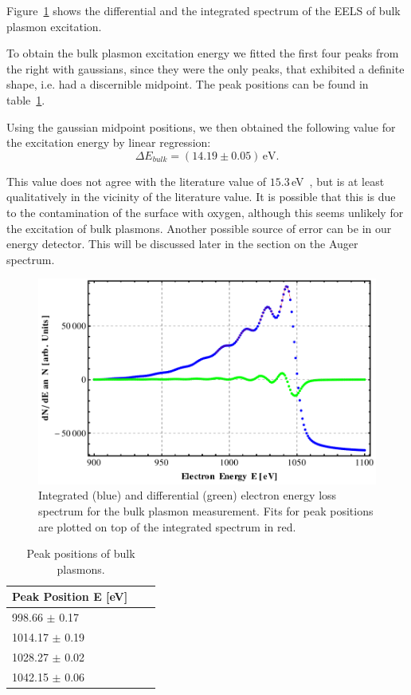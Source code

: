 \documentclass[a4paper,10pt]{scrartcl}
\begin{document}
Figure~\ref{fig:bulkpeaks} shows the differential and the integrated spectrum of the EELS of bulk plasmon excitation. 

To obtain the bulk plasmon excitation energy we fitted the first four peaks from the right with gaussians, since they were the only peaks, that exhibited a definite shape, i.e. had a discernible midpoint. The peak positions can be found in table~\ref{tab:bulkpeaks}.

Using the gaussian midpoint positions, we then obtained the following value for the excitation energy by linear regression:
\begin{equation}
\Delta E_{bulk} = (14.19 \pm 0.05)\,\mbox{eV}.
\end{equation}

This value does not agree with the literature value of $15.3\,$eV~\cite{plasmonpaper}, but is at least qualitatively in the vicinity of the literature value. It is possible that this is due to the contamination of the surface with oxygen, although this seems unlikely for the excitation of bulk plasmons. Another possible source of error can be in our energy detector. This will be discussed later in the section on the Auger spectrum.

\begin{figure}
\centering
\includegraphics[scale=0.6]{img/bulkpeaks}
\caption{Integrated (blue) and differential (green) electron energy loss spectrum for the bulk plasmon measurement. Fits for peak positions are plotted on top of the integrated spectrum in red. \label{fig:bulkpeaks}}
\end{figure}


\begin{table}
\begin{center}
\begin{tabular}{lcc}
\toprule
Peak Position E [eV]\\
\midrule
\phantom{0}998.66 $\pm$ 0.17 \\
1014.17 $\pm$ 0.19 \\
1028.27 $\pm$ 0.02 \\
1042.15 $\pm$ 0.06 \\
\bottomrule
\end{tabular}
\end{center}
\par
\caption{Peak positions of bulk plasmons. \label{tab:bulkpeaks}}
\end{table}
\end{document}
